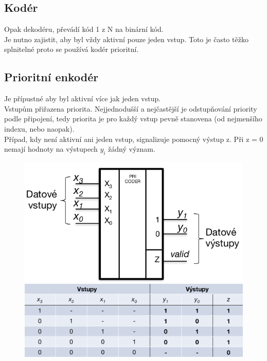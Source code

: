 \subsection{Kodér}
Opak dekodéru, převádí kód 1 z N na binární kód. \\
Je nutno zajistit, aby byl vždy aktivní pouze jeden vstup. Toto je často těžko splnitelné proto se používá kodér prioritní.\\

\subsection{Prioritní enkodér}
Je přípustné aby byl aktivní více jak jeden vstup.\\
Vstupům přiřazena priorita. Nejjednodušší a nejčastější je odstupňování priority podle připojení, tedy priorita je pro každý vstup pevně stanovena (od nejmenšího indexu, nebo naopak).\\
Případ, kdy není aktivní ani jeden vstup, signalizuje pomocný výstup z. Při z = 0 nemají hodnoty na výstupech \(y_i\) žádný význam.\\

\begin{figure}[h!]
    \centering
    \begin{minipage}[b]{0.4\textwidth}
        \includegraphics[width=\textwidth]{img/PrioEn.png}
    \end{minipage}
    \hfill
    \begin{minipage}[b]{0.4\textwidth}
        \includegraphics[width = \textwidth]{img/PriEnTab.png}
    \end{minipage}
\end{figure}

